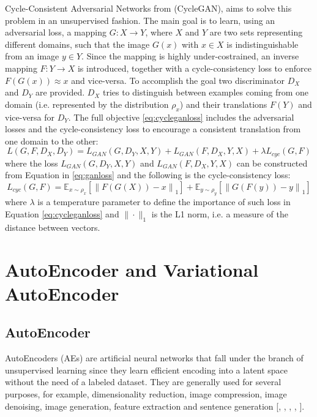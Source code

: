 Cycle-Consistent Adversarial Networks from \citet{CycleGAN2017} (CycleGAN), aims to solve this problem in an unsupervised fashion. The main goal is to learn, using an adversarial loss, a mapping $G:X\rightarrow Y$, where $X$ and $Y$ are two sets representing different domains, such that the image $G(x) $ with $x\in X$ is indistinguishable from an image $y\in Y$. Since the mapping is highly under-costrained, an inverse mapping $F:Y \rightarrow X$ is introduced, together with a cycle-consistency loss to enforce $F(G(x)) \approx x$ and vice-versa.
To accomplish the goal two discriminator $D_{X}$ and $D_{Y}$ are provided. $D_{X}$ tries to distinguish between examples coming from one domain (i.e. represented by the distribution $\rho_{x}$) and their translations $F(Y)$ and vice-versa for $D_{Y}$. 
The full objective \ref{eq:cycleganloss} includes the adversarial losses and the cycle-consistency loss to encourage a consistent translation from one domain to the other:
\begin{equation}
  \label{eq:cycleganloss}
  L(G,F,D_{X}, D_{Y}) = L_{GAN}(G, D_{Y},X,Y) + L_{GAN}(F, D_{X},Y,X) + \lambda L_{cyc}(G,F)
\end{equation}
where the loss $L_{GAN}(G, D_{Y},X,Y)$ and $L_{GAN}(F, D_{X},Y,X)$ can be constructed from Equation in \ref{eq:ganloss}
and the following is the cycle-consistency loss:
\begin{equation}
  L_{cyc}(G,F) =  \mathbb{E}_{x\sim \rho_{x}}[\left \| F(G(X))-x \right \|_1] + \mathbb{E}_{y\sim \rho_{y}}[\left \| G(F(y))-y \right \|_1]
\end{equation}
where $\lambda$ is a temperature parameter to define the importance of such loss in Equation \ref{eq:cycleganloss} and $\| \cdot \|_1$ is the L1 norm, i.e. a measure of the distance between vectors.

\section{AutoEncoder and Variational AutoEncoder}

\subsection{AutoEncoder}
AutoEncoders (AEs) are artificial neural networks that fall under the branch of unsupervised learning since they learn efficient encoding into a latent space without the need of a labeled dataset. They are generally used for several purposes, for example, dimensionality reduction, image compression, image denoising, image generation, feature extraction and sentence generation [\citet{doi:10.1126/science.1127647}, \citet{8456308}, \citet{7836672}, \citet{7926714}, \citet{8852155}]. 

